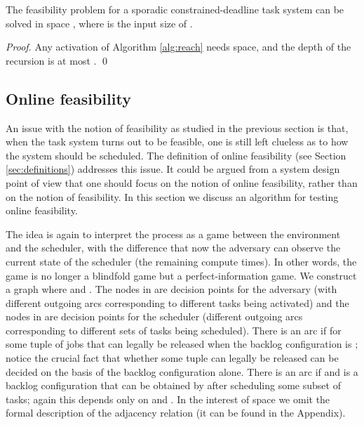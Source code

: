 \documentclass{llncs}
\begin{document}
\begin{theorem}
The feasibility problem for a sporadic constrained-deadline task system  can be solved in space , where  is the input size of . 
\end{theorem}
\begin{proof}
Any activation of Algorithm \ref{alg:reach} needs  space, and the depth of the recursion is at most .
\qed
\end{proof}

\subsection{Online feasibility}
\label{sec:onlinefeas}
An issue with the notion of feasibility as studied in the previous section is  that, when the task system turns out to be feasible, one is still left clueless as to how the system should be scheduled. The definition of online feasibility (see Section \ref{sec:definitions}) addresses this issue. 
It could be argued from a system design point of view that one should focus on the notion of online feasibility, rather than on the notion of feasibility. 
In this section we discuss an algorithm for testing online feasibility. 





The idea is again to interpret the process as a game between the environment and the scheduler, with the difference that now the adversary can observe the current state of the scheduler (the remaining compute times). In other words, the game is no longer a blindfold game but a perfect-information game. We construct a graph  where  and . The nodes in  are decision points for the adversary (with different outgoing arcs corresponding to different tasks being activated) and the nodes in  are decision points for the scheduler (different outgoing arcs corresponding to different sets of tasks being scheduled). There is an arc  if  for some tuple  of jobs that can legally be released when the backlog configuration is ; notice the crucial fact that whether some tuple  can legally be released can be decided on the basis of the backlog configuration  alone. There is an arc  if  and  is a backlog configuration that can be obtained by  after scheduling some subset of tasks; again this depends only on  and . In the interest of space we omit the formal description of the adjacency relation (it can be found in the Appendix). 
\end{document}
